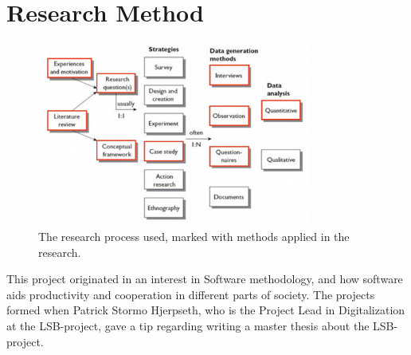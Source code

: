 \section{Research Method}

\begin{figure}
    \begin{center}
        \includegraphics[width=0.8\textwidth]{fig/empirisk_studie.png}
        \caption{The research process used, marked with methods applied in the research.}
    \end{center}
    \label{fig:my_label}
\end{figure}

This project originated in an interest in Software methodology, and how software aids productivity and cooperation in different parts of society. The projects formed when Patrick Stormo Hjerpseth, who is the Project Lead in Digitalization at the LSB-project, gave a tip regarding writing a master thesis about the LSB-project.

